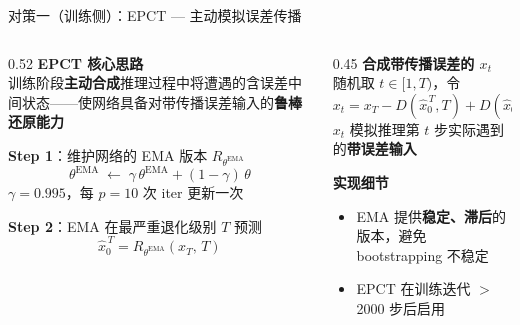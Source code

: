 \documentclass[aspectratio=169,10pt]{beamer}
\newcommand{\thetaEMA}{\theta^{\mathrm{EMA}}}
\newcommand{\hterm}[1]{\textcolor{Brick}{\textbf{#1}}}
\begin{document}
\begin{frame}{对策一（训练侧）：EPCT — 主动模拟误差传播}
  \vspace{0.3em}
  \begin{columns}[T]
    \begin{column}{0.52\textwidth}
      \textbf{EPCT 核心思路}
      \\[3pt]
      训练阶段\hterm{主动合成}推理过程中将遭遇的含误差中间状态——使网络具备对带传播误差输入的\textbf{鲁棒还原能力}
      \vspace{0.5em}

      \textbf{Step 1}：维护网络的 EMA 版本 $R_{\thetaEMA}$
      \[
        \thetaEMA\;\leftarrow\;
        \gamma\,\thetaEMA+(1-\gamma)\,\theta
      \]
      \vspace{0.2em}
      \footnotesize $\gamma=0.995$，每 $p=10$ 次 iter 更新一次
      \vspace{0.5em}

      \textbf{Step 2}：EMA 在最严重退化级别 $T$ 预测
      \[
        \hat{x}_0^{\,T}=R_{\thetaEMA}(x_T,\,T)
      \]
    \end{column}
    \begin{column}{0.45\textwidth}
      \textbf{合成带传播误差的 $x_t$}
      \\[3pt]
      随机取 $t\in[1,T)$，令
      \[
        x_t=x_T-D(\hat{x}_0^{\,T},T)+D(\hat{x}_0^{\,T},t)
      \]
      \vspace{0.2em}
      \footnotesize $x_t$ 模拟推理第 $t$ 步实际遇到的\textbf{带误差输入}
      \vspace{0.8em}

      \textbf{实现细节}
      \begin{itemize}
        \item EMA 提供\textbf{稳定、滞后}的版本，避免 bootstrapping 不稳定
        \item EPCT 在训练迭代 $>$ 2000 步后启用
      \end{itemize}
    \end{column}
  \end{columns}
\end{frame}
\end{document}
